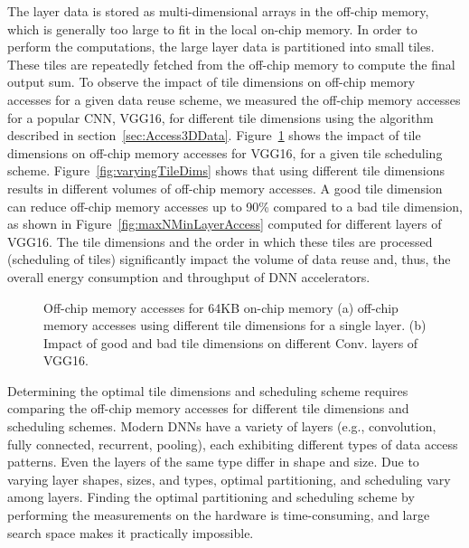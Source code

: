 The layer data is stored as multi-dimensional arrays in the off-chip memory, which is generally too large to fit in the local on-chip memory. In order to perform the computations, the large layer data is partitioned into small tiles. These tiles are repeatedly fetched from the off-chip memory to compute the final output sum. To observe the impact of tile dimensions on off-chip memory accesses for a given data reuse scheme, we measured the off-chip memory accesses for a popular CNN, VGG16, for different tile dimensions using the algorithm described in section~\ref{sec:Access3DData}. Figure~\ref{fig:impactOfTileDims} shows the impact of tile dimensions on off-chip memory accesses for VGG16, for a given tile scheduling scheme. Figure~\ref{fig:varyingTileDims} shows that using different tile dimensions results in different volumes of off-chip memory accesses. A good tile dimension can reduce off-chip memory accesses up to 90\% compared to a bad tile dimension, as shown in Figure~\ref{fig:maxNMinLayerAccess} computed for different layers of VGG16. The tile dimensions and the order in which these tiles are processed (scheduling of tiles) significantly impact the volume of data reuse and, thus, the overall energy consumption and throughput of DNN accelerators.
\begin{figure}[!h]
	\centering
	\captionsetup{font=sf}
	\hfil	
	\hfil	
	\caption{Off-chip memory accesses for 64KB on-chip memory (a) off-chip memory accesses using different tile dimensions for a single layer. (b) Impact of good and bad tile dimensions on different Conv. layers of VGG16.}
	\label{fig:impactOfTileDims}
\end{figure}

Determining the optimal tile dimensions and scheduling scheme requires comparing the off-chip memory accesses for different tile dimensions and scheduling schemes. Modern DNNs have a variety of layers (e.g., convolution, fully connected, recurrent, pooling), each exhibiting different types of data access patterns. Even the layers of the same type differ in shape and size. Due to varying layer shapes, sizes, and types, optimal partitioning, and scheduling vary among layers. Finding the optimal partitioning and scheduling scheme by performing the measurements on the hardware is time-consuming, and large search space makes it practically impossible.

